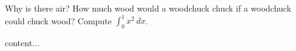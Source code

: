 \documentclass[ignorenonframetext]{beamer}
\begin{document}
\begin{questions}
\question[10]
Why is there air?
\question[15]
How much wood would a woodchuck chuck if a woodchuck could chuck
wood?
\question[10] Compute $\displaystyle\int_0^1 x^2 \, dx$.
\end{questions}

\begin{frame}
content...
\end{frame}
\end{document}
